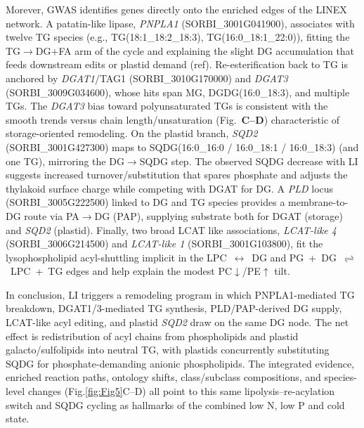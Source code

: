 \documentclass[10pt,letterpaper]{article}
\begin{document}
\begin{itemize}
Morever, GWAS identifies genes directly onto the enriched edges of the LINEX network. A patatin-like lipase, \textit{PNPLA1} (SORBI\_3001G041900), associates with twelve TG species (e.g., TG(18{:}1\_18{:}2\_18{:}3), TG(16{:}0\_18{:}1\_22{:}0)), fitting the TG$\rightarrow$DG$+$FA arm of the cycle and explaining the slight DG accumulation that feeds downstream edits or plastid demand (ref). Re-esterification back to TG is anchored by \textit{DGAT1}/TAG1 (SORBI\_3010G170000) and \textit{DGAT3} (SORBI\_3009G034600), whose hits span MG, DGDG(16{:}0\_18{:}3), and multiple TGs. The \textit{DGAT3} bias toward polyunsaturated TGs is consistent with the smooth trends versus chain length/unsaturation (Fig.\ \textbf{C–D}) characteristic of storage-oriented remodeling. On the plastid branch, \textit{SQD2} (SORBI\_3001G427300) maps to SQDG(16{:}0\_16{:}0 / 16{:}0\_18{:}1 / 16{:}0\_18{:}3) (and one TG), mirroring the DG$\rightarrow$SQDG step. The observed SQDG decrease with LI suggests increased turnover/substitution that spares phosphate and adjusts the thylakoid surface charge while competing with DGAT for DG. A \textit{PLD} locus (SORBI\_3005G222500) linked to DG and TG species provides a membrane-to-DG route via PA$\rightarrow$DG (PAP), supplying substrate both for DGAT (storage) and \textit{SQD2} (plastid). Finally, two broad LCAT like associations, \textit{LCAT-like 4} (SORBI\_3006G214500) and \textit{LCAT-like 1} (SORBI\_3001G103800), fit the lysophospholipid acyl-shuttling implicit in the \mbox{LPC $\leftrightarrow$ DG} and \mbox{PG + DG $\rightleftharpoons$ LPC + TG} edges and help explain the modest PC$\downarrow$/PE$\uparrow$ tilt.

In conclusion, LI triggers a remodeling program in which PNPLA1-mediated TG breakdown, DGAT1/3-mediated TG synthesis, PLD/PAP-derived DG supply, LCAT-like acyl editing, and plastid \textit{SQD2} draw on the same DG node. The net effect is redistribution of acyl chains from phospholipids and plastid galacto/sulfolipids into neutral TG, with plastids concurrently substituting SQDG for phosphate-demanding anionic phospholipids. The integrated evidence, enriched reaction paths, ontology shifts, class/subclass compositions, and species-level changes (Fig.\ref{fig:Fig5}C–D) all point to this same lipolysis–re-acylation switch and SQDG cycling as hallmarks of the combined low N, low P and cold state.



\end{itemize}
\end{document}
